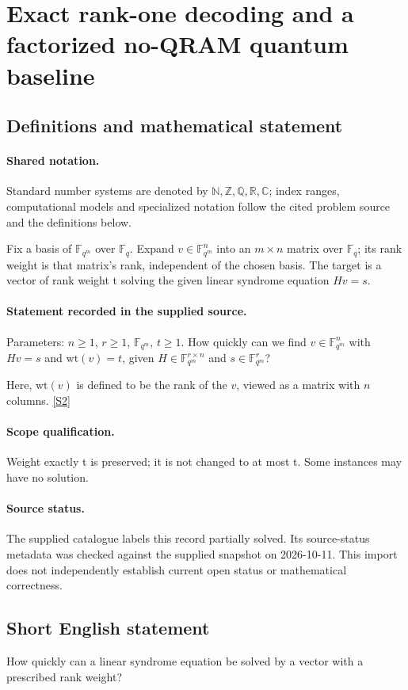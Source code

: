 \documentclass[11pt]{article}
\newcommand{\sref}[2]{\hyperlink{source:#1:#2}{[S#2]}}
\begin{document}
\section{Exact rank-one decoding and a factorized no-QRAM quantum baseline}\label{statement}

\subsection{Definitions and mathematical statement}

\paragraph{Shared notation.}Standard number systems are denoted by $\mathbb N,\mathbb Z,\mathbb Q,\mathbb R,\mathbb C$; index ranges, computational models and specialized notation follow the cited problem source and the definitions below.


Fix a basis of $\mathbb F_{q^m}$ over $\mathbb F_q$. Expand $v\in\mathbb F_{q^m}^n$ into an $m\times n$ matrix over $\mathbb F_q$; its rank weight is that matrix's rank, independent of the chosen basis. The target is a vector of rank weight t solving the given linear syndrome equation $Hv=s$.
\paragraph{Statement recorded in the supplied source.}
Parameters: $n \geq 1$, $r\geq 1$, $\mathbb F_{q^m}$, $t \geq 1$. How quickly can we find $v\in \mathbb F_{q^m}^n$ with $Hv = s$ and $\text{wt}(v) = t$, given $H\in \mathbb F_{q^m}^{r\times n}$ and $s\in \mathbb F_{q^m}^r$?

Here, $\text{wt}(v)$ is defined to be the rank of the $v$, viewed as a matrix with $n$ columns. \sref{statement}{2}
\paragraph{Scope qualification.}
Weight exactly t is preserved; it is not changed to at most t. Some instances may have no solution.
\paragraph{Source status.}
The supplied catalogue labels this record partially solved. Its source-status metadata was checked against the supplied snapshot on 2026-10-11. This import does not independently establish current open status or mathematical correctness.
\subsection{Short English statement}
How quickly can a linear syndrome equation be solved by a vector with a prescribed rank weight?
\end{document}
